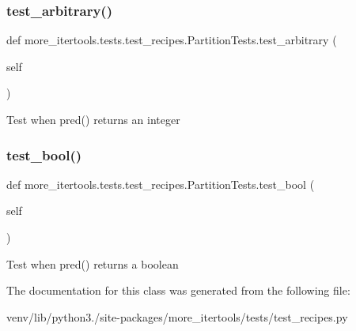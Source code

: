 \subsubsection{\texorpdfstring{test\+\_\+arbitrary()}{test\_arbitrary()}}
{\footnotesize\ttfamily def more\+\_\+itertools.\+tests.\+test\+\_\+recipes.\+Partition\+Tests.\+test\+\_\+arbitrary (\begin{DoxyParamCaption}\item[{}]{self }\end{DoxyParamCaption})}

\begin{DoxyVerb}Test when pred() returns an integer\end{DoxyVerb}
 \mbox{\label{classmore__itertools_1_1tests_1_1test__recipes_1_1_partition_tests_a2f02ea765f6749adf546efe1950f8aa9}} 
\subsubsection{\texorpdfstring{test\+\_\+bool()}{test\_bool()}}
{\footnotesize\ttfamily def more\+\_\+itertools.\+tests.\+test\+\_\+recipes.\+Partition\+Tests.\+test\+\_\+bool (\begin{DoxyParamCaption}\item[{}]{self }\end{DoxyParamCaption})}

\begin{DoxyVerb}Test when pred() returns a boolean\end{DoxyVerb}
 

The documentation for this class was generated from the following file\+:\begin{DoxyCompactItemize}
\item 
venv/lib/python3./site-\/packages/more\+\_\+itertools/tests/test\+\_\+recipes.\+py\end{DoxyCompactItemize}
